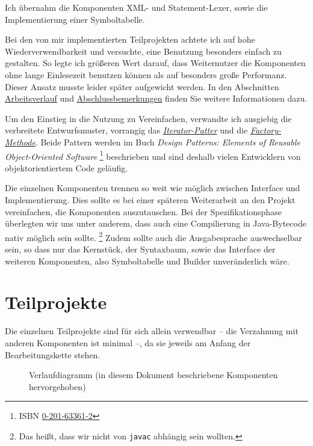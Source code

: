 \documentclass[10pt,a4paper,ngerman,titlepage,tocindentauto]{article}
\begin{document}
		Ich übernahm die Komponenten XML- und Statement-Lexer, sowie die Implementierung einer Symboltabelle.
		
		Bei den von mir implementierten Teilprojekten achtete ich auf hohe Wiederverwendbarkeit
		und versuchte, eine Benutzung besonders einfach zu gestalten. So legte ich größeren Wert darauf,
		dass Weiternutzer die Komponenten ohne lange Einlesezeit benutzen können als auf besonders große
		Performanz. Dieser Ansatz musste leider später aufgewicht werden. In den Abschnitten
		\hyperlink{Arbeitsverlauf}{Arbeitsverlauf} und \hyperlink{Abschlussbemerkungen}{Abschlussbemerkungen}
		finden Sie weitere Informationen dazu.
		
		Um den Einstieg in die Nutzung zu Vereinfachen, verwandte ich ausgiebig die verbreitete Entwurfsmuster,
		vorrangig das \href{http://c2.com/cgi/wiki?IteratorPattern}{\em Iterator-Patter} und die
		\href{http://c2.com/cgi/wiki?FactoryMethodPattern}{\em Factory-Methode}.
		Beide Pattern werden im Buch {\em Design Patterns: Elements of Reusable Object-Oriented Software}%
		\footnote{ISBN \href{https://portal.d-nb.de/opac.htm?method=simpleSearch&query=0201633612}{0-201-63361-2}}
		beschrieben und sind deshalb vielen Entwicklern von objektorientiertem Code geläufig.
		
		Die einzelnen Komponenten trennen so weit wie möglich zwischen Interface und Implementierung.
		Dies sollte es bei einer späteren Weiterarbeit an den Projekt vereinfachen, die Komponenten
		auszutauschen. Bei der Spezifikationsphase überlegten wir uns unter anderem, dass auch eine
		Compilierung in Java-Bytecode nativ möglich sein sollte.%
		\footnote{Das heißt, dass wir nicht von \texttt{javac} abhängig sein wollten.}
		Zudem sollte auch die Ausgabesprache auswechselbar sein, so dass nur das Kernstück,
		der Syntaxbaum, sowie das Interface der weiteren Komponenten, also Symboltabelle und Builder
		unveränderlich wäre.
		
	\section{Teilprojekte}
		Die einzelnen Teilprojekte sind für sich allein verwendbar – die Verzahnung
		mit anderen Komponenten ist minimal –, da sie jeweils am Anfang der Bearbeitungskette stehen.
		
		\begin{figure}[ht]
			\caption[Verlaufdiagramm]{Verlaufdiagramm (in diesem Dokument beschriebene Komponenten hervorgehoben)}
		\end{figure}
		
\end{document}
